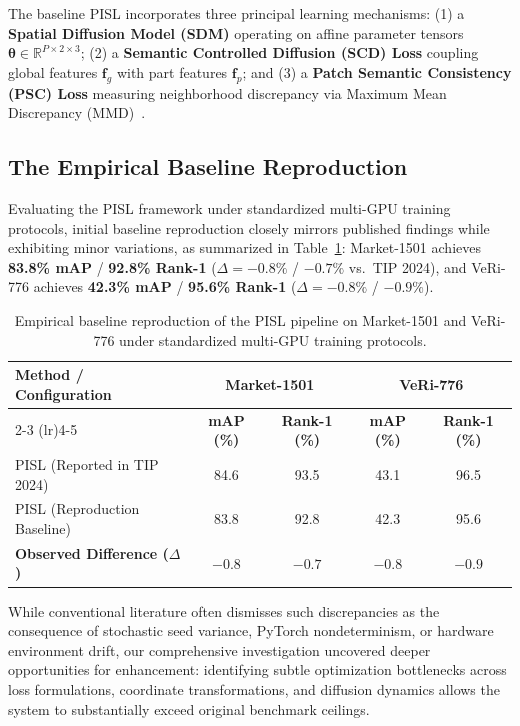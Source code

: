 The baseline PISL incorporates three principal learning mechanisms: (1) a \textbf{Spatial Diffusion Model (SDM)} operating on affine parameter tensors $\boldsymbol{\theta} \in \mathbb{R}^{P \times 2 \times 3}$; (2) a \textbf{Semantic Controlled Diffusion (SCD) Loss} coupling global features $\mathbf{f}_g$ with part features $\mathbf{f}_p$; and (3) a \textbf{Patch Semantic Consistency (PSC) Loss} measuring neighborhood discrepancy via Maximum Mean Discrepancy (MMD)~\cite{gretton2012mmd}.

\subsection{The Empirical Baseline Reproduction}
\label{subsec:repro_deficit}

Evaluating the PISL framework under standardized multi-GPU training protocols, initial baseline reproduction closely mirrors published findings while exhibiting minor variations, as summarized in Table~\ref{tab:intro_reproduction_deficit}: Market-1501 achieves \textbf{83.8\% mAP} / \textbf{92.8\% Rank-1} ($\Delta = -0.8\%$ / $-0.7\%$ vs.\ TIP 2024), and VeRi-776 achieves \textbf{42.3\% mAP} / \textbf{95.6\% Rank-1} ($\Delta = -0.8\%$ / $-0.9\%$).

\begin{table}[ht]
\centering
\caption[Empirical baseline reproduction of the PISL pipeline]{Empirical baseline reproduction of the PISL pipeline on Market-1501 and VeRi-776 under standardized multi-GPU training protocols.}
\label{tab:intro_reproduction_deficit}
\begin{tabular}{lcccc}
\toprule
\multirow{2}{*}{\textbf{Method / Configuration}} & \multicolumn{2}{c}{\textbf{Market-1501}} & \multicolumn{2}{c}{\textbf{VeRi-776}} \\
\cmidrule(lr){2-3} \cmidrule(lr){4-5}
& \textbf{mAP (\%)} & \textbf{Rank-1 (\%)} & \textbf{mAP (\%)} & \textbf{Rank-1 (\%)} \\
\midrule
PISL (Reported in TIP 2024)~\cite{tao2024unsupervised} & 84.6 & 93.5 & 43.1 & 96.5 \\
PISL (Reproduction Baseline) & 83.8 & 92.8 & 42.3 & 95.6 \\
\midrule
\textbf{Observed Difference ($\Delta$)} & \textbf{$-0.8$} & \textbf{$-0.7$} & \textbf{$-0.8$} & \textbf{$-0.9$} \\
\bottomrule
\end{tabular}
\end{table}

While conventional literature often dismisses such discrepancies as the consequence of stochastic seed variance, PyTorch nondeterminism, or hardware environment drift, our comprehensive investigation uncovered deeper opportunities for enhancement: identifying subtle optimization bottlenecks across loss formulations, coordinate transformations, and diffusion dynamics allows the system to substantially exceed original benchmark ceilings.

